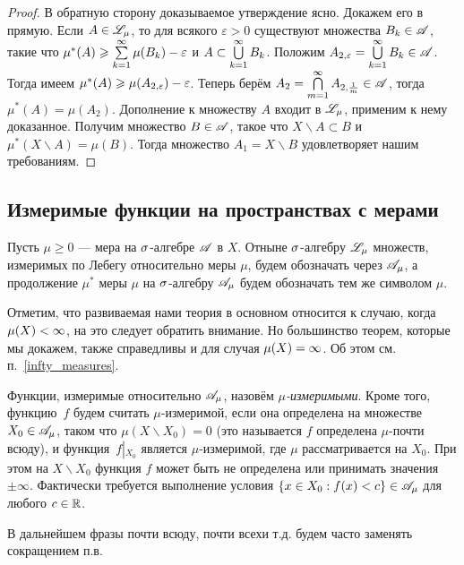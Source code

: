 \documentclass[10pt]{article}
\newcommand{\ve}{\varepsilon}
\begin{document}
\begin{proof}
В обратную сторону доказываемое утверждение ясно. Докажем его в
прямую. Если $A\in\mathscr{L}_\mu$, то для всякого $\ve>0$ существуют
множества $B_k\in\mathscr{A}$, такие что $\mu^*(A)\ge\sumkui\mu(B_k)-\ve$ и
$A\subset\bigcup\limits_{k=1}^{\infty} B_k$. Положим $A_{2,\ve}=\cupkui B_k\in\As$. Тогда
имеем $\mu^*(A)\bw\ge\mu(A_{2,\ve})-\ve$. Теперь берём
$A_2=\bigcap\limits_{m=1}^\infty A_{2,\frac1m}\in\mathscr{A}$, тогда
$\mu^*(A)=\mu(A_2)$. Дополнение к множеству $A$ входит в $\mathscr{L}_\mu$,
применим к нему доказанное. Получим множество $B\in\mathscr{A}$, такое что
$X\backslash A\subset B$ и $\mu^*(X\backslash A)=\mu(B)$. Тогда
множество $A_1=X\backslash B$ удовлетворяет нашим требованиям.
\end{proof}


\subsection{Измеримые функции на пространствах с мерами}

Пусть $\mu\ge0$ --- мера на $\sigma$-алгебре $\mathscr{A}$ в $X$. Отныне
$\sigma$-алгебру $\mathscr{L}_\mu$ множеств, измеримых по Лебегу относительно
меры $\mu$, будем обозначать через $\mathscr{A}_\mu$, а продолжение $\mu^*$
меры $\mu$ на $\sigma$-алгебру $\mathscr{A}_\mu$ будем обозначать тем же
символом $\mu$.

Отметим, что развиваемая нами теория в основном относится к случаю,
когда $\mu(X)\bw <\infty$, на это следует обратить внимание. Но
большинство теорем, которые мы докажем, также справедливы и для
случая $\mu(X)\bw =\infty$. Об этом см. п.~\ref{infty_measures}.

\begin{df}
Функции, измеримые относительно $\mathscr{A}_\mu$, назовём
\emph{$\mu$-измеримыми}. Кроме того, функцию~$f$ будем считать
$\mu$-измеримой, если она определена на множестве $X_0\in\mathscr{A}_\mu$,
таком что $\mu(X\backslash X_0)=0$ (это называется  $f$
определена $\mu$-почти всюду), и функция~$f\left|_{X_0}\right.$
является $\mu$-измеримой, где $\mu$ рассматривается на $X_0$. При
этом на $X\backslash X_0$ функция $f$ может быть не определена или
принимать значения $\pm\infty$. Фактически требуется выполнение
условия $\{x\in X_0: f(x)<c\}\in\mathscr{A}_\mu$ для любого $c\in\mathbb{R}$.
\end{df}

\begin{note}
В дальнейшем фразы  почти всюду,  почти всех и т.д.
будем часто заменять сокращением  п.в.
\end{note}
\end{document}
